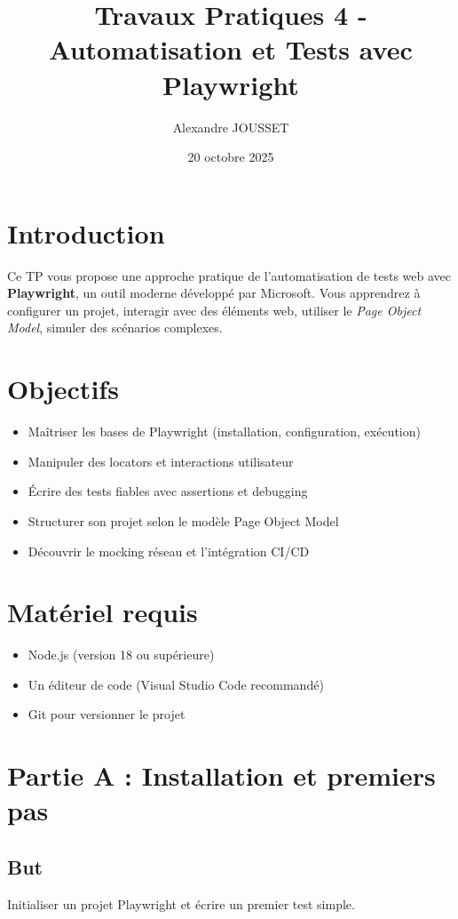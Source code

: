 \documentclass[a4paper,12pt]{article}
\title{Travaux Pratiques 4 - Automatisation et Tests avec Playwright}
\author{Alexandre JOUSSET}
\date{20 octobre 2025}
\begin{document}
\maketitle

\section*{Introduction}
Ce TP vous propose une approche pratique de l’automatisation de tests web avec \textbf{Playwright}, un outil moderne développé par Microsoft. Vous apprendrez à configurer un projet, interagir avec des éléments web, utiliser le \textit{Page Object Model}, simuler des scénarios complexes.

\section*{Objectifs}
\begin{itemize}
\item Maîtriser les bases de Playwright (installation, configuration, exécution)
\item Manipuler des locators et interactions utilisateur
\item Écrire des tests fiables avec assertions et debugging
\item Structurer son projet selon le modèle Page Object Model
\item Découvrir le mocking réseau et l’intégration CI/CD
\end{itemize}

\section*{Matériel requis}
\begin{itemize}
\item Node.js (version 18 ou supérieure)
\item Un éditeur de code (Visual Studio Code recommandé)
\item Git pour versionner le projet
\end{itemize}

\newpage
\section*{Partie A : Installation et premiers pas}
\subsection*{But}
Initialiser un projet Playwright et écrire un premier test simple.
\end{document}
